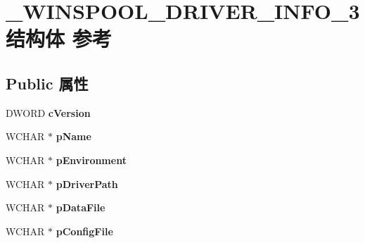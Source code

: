 \hypertarget{struct___w_i_n_s_p_o_o_l___d_r_i_v_e_r___i_n_f_o__3}{}\section{\+\_\+\+W\+I\+N\+S\+P\+O\+O\+L\+\_\+\+D\+R\+I\+V\+E\+R\+\_\+\+I\+N\+F\+O\+\_\+3结构体 参考}
\label{struct___w_i_n_s_p_o_o_l___d_r_i_v_e_r___i_n_f_o__3}
\subsection*{Public 属性}
\begin{DoxyCompactItemize}
\item 
\mbox{\label{struct___w_i_n_s_p_o_o_l___d_r_i_v_e_r___i_n_f_o__3_a2ba361e340b7b2f0d6964b951c615921}} 
D\+W\+O\+RD {\bfseries c\+Version}
\item 
\mbox{\label{struct___w_i_n_s_p_o_o_l___d_r_i_v_e_r___i_n_f_o__3_a504be084a8a4b41f501680c021969749}} 
W\+C\+H\+AR $\ast$ {\bfseries p\+Name}
\item 
\mbox{\label{struct___w_i_n_s_p_o_o_l___d_r_i_v_e_r___i_n_f_o__3_a2106a71654303436a16867b1bbfa3d4e}} 
W\+C\+H\+AR $\ast$ {\bfseries p\+Environment}
\item 
\mbox{\label{struct___w_i_n_s_p_o_o_l___d_r_i_v_e_r___i_n_f_o__3_a216dc9d266a30d3e9208cded2c7b2759}} 
W\+C\+H\+AR $\ast$ {\bfseries p\+Driver\+Path}
\item 
\mbox{\label{struct___w_i_n_s_p_o_o_l___d_r_i_v_e_r___i_n_f_o__3_ad4854e46907aff2491955abc998a9856}} 
W\+C\+H\+AR $\ast$ {\bfseries p\+Data\+File}
\item 
\mbox{\label{struct___w_i_n_s_p_o_o_l___d_r_i_v_e_r___i_n_f_o__3_a52292e97169bd4c6612e8402df0fa52c}} 
W\+C\+H\+AR $\ast$ {\bfseries p\+Config\+File}
\item 

\end{DoxyCompactItemize}
